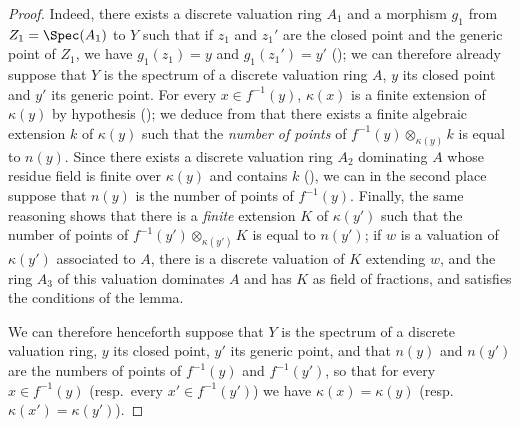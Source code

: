 \begin{proof}
Indeed, there exists a discrete valuation ring $A_1$ and a morphism $g_1$ from $Z_1=\Spec(A_1)$ to $Y$ such that if $z_1$ and $z_1'$ are the closed point and the generic point of $Z_1$, we have $g_1(z_1)=y$ and $g_1(z_1')=y'$ (); we can therefore already suppose that $Y$ is the spectrum of a discrete valuation ring $A$, $y$ its closed point and $y'$ its generic point.
For every $x\in f^{-1}(y)$, $\kappa(x)$ is a finite extension of $\kappa(y)$ by hypothesis (); we deduce from  that there exists a finite algebraic extension $k$ of $\kappa(y)$ such that the \emph{number of points} of $f^{-1}(y)\otimes_{\kappa(y)}k$ is equal to $n(y)$.
Since there exists a discrete valuation ring $A_2$ dominating $A$ whose residue field is finite over $\kappa(y)$ and contains $k$ (), we can in the second place suppose that $n(y)$ is the number of points of $f^{-1}(y)$.
Finally, the same reasoning shows that there is a \emph{finite} extension $K$ of $\kappa(y')$ such that the number of points of $f^{-1}(y')\otimes_{\kappa(y')}K$ is equal to $n(y')$; if $w$ is a valuation of $\kappa(y')$ associated to $A$, there is a discrete valuation of $K$ extending $w$, and the ring $A_3$ of this valuation dominates $A$ and has $K$ as field of fractions, and satisfies the conditions of the lemma.

We can therefore henceforth suppose that $Y$ is the spectrum of a discrete valuation ring, $y$ its closed point, $y'$ its generic point, and that $n(y)$ and $n(y')$ are the numbers of points of $f^{-1}(y)$ and $f^{-1}(y')$, so that for every $x\in f^{-1}(y)$ (resp.\ every $x'\in f^{-1}(y')$) we have $\kappa(x)=\kappa(y)$ (resp.\ $\kappa(x')=\kappa(y')$).


\end{proof}
